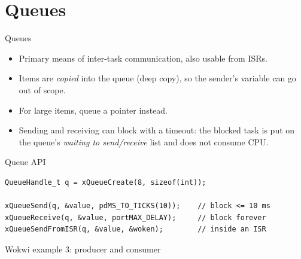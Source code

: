 \section{Queues}
\label{sec:queues}

\begin{frame}{Queues}
  \begin{itemize}
    \item Primary means of inter-task communication, also usable from ISRs.
    \item Items are \emph{copied} into the queue (deep copy), so the sender's variable can go out of scope.
    \item For large items, queue a pointer instead.
    \item Sending and receiving can block with a timeout: the blocked task is put on the queue's \emph{waiting to send/receive} list and does not consume CPU.
  \end{itemize}
\end{frame}

\begin{frame}[fragile]{Queue API}
\begin{lstlisting}
QueueHandle_t q = xQueueCreate(8, sizeof(int));

xQueueSend(q, &value, pdMS_TO_TICKS(10));    // block <= 10 ms
xQueueReceive(q, &value, portMAX_DELAY);     // block forever
xQueueSendFromISR(q, &value, &woken);        // inside an ISR
\end{lstlisting}
\end{frame}

\begin{frame}[fragile]{Wokwi example 3: producer and consumer}
\iftoggle{slides}{%
  \begin{columns}[T]
    \begin{column}{0.56\textwidth}
      
    \end{column}
    \begin{column}{0.42\textwidth}
      \small
      \begin{itemize}
        \item Queue of 4 \texttt{int}; Prod priority 1, Cons priority 2.
        \item Prod sends every 3 ticks (48\,ms).
        \item Logic analyzer (D0 = Prod, D1 = Cons): Cons preempts Prod inside \texttt{xQueueSend()} and takes the item at once.
        \item \texttt{pdMS\_TO\_TICKS(15)} is 0 ticks: no delay at all.
        \item Try: exchange the priorities and make Cons slower than Prod: the queue fills up.
      \end{itemize}
    \end{column}
  \end{columns}
}{%
  \wokwiexample{ex03_queue}{Producer/consumer with a queue}{lst:ex03}%
}
\end{frame}

